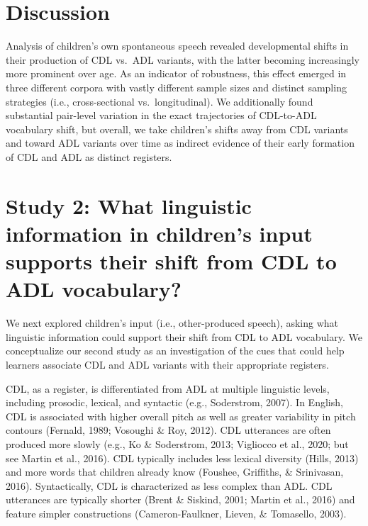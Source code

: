 \documentclass[10pt, letterpaper]{article}
\begin{document}
\hypertarget{discussion}{%
\section{Discussion}\label{discussion}}

Analysis of children's own spontaneous speech revealed developmental
shifts in their production of CDL vs.~ADL variants, with the latter
becoming increasingly more prominent over age. As an indicator of
robustness, this effect emerged in three different corpora with vastly
different sample sizes and distinct sampling strategies (i.e.,
cross-sectional vs.~longitudinal). We additionally found substantial
pair-level variation in the exact trajectories of CDL-to-ADL vocabulary
shift, but overall, we take children's shifts away from CDL variants and
toward ADL variants over time as indirect evidence of their early
formation of CDL and ADL as distinct registers.

\hypertarget{study-2-what-linguistic-information-in-childrens-input-supports-their-shift-from-cdl-to-adl-vocabulary}{%
\section{Study 2: What linguistic information in children's input
supports their shift from CDL to ADL
vocabulary?}\label{study-2-what-linguistic-information-in-childrens-input-supports-their-shift-from-cdl-to-adl-vocabulary}}

We next explored children's input (i.e., other-produced speech), asking
what linguistic information could support their shift from CDL to ADL
vocabulary. We conceptualize our second study as an investigation of the
cues that could help learners associate CDL and ADL variants with their
appropriate registers.

CDL, as a register, is differentiated from ADL at multiple linguistic
levels, including prosodic, lexical, and syntactic (e.g., Soderstrom,
2007). In English, CDL is associated with higher overall pitch as well
as greater variability in pitch contours (Fernald, 1989; Vosoughi \&
Roy, 2012). CDL utterances are often produced more slowly (e.g., Ko \&
Soderstrom, 2013; Vigliocco et al., 2020; but see Martin et al., 2016).
CDL typically includes less lexical diversity (Hills, 2013) and more
words that children already know (Foushee, Griffiths, \& Srinivasan,
2016). Syntactically, CDL is characterized as less complex than ADL. CDL
utterances are typically shorter (Brent \& Siskind, 2001; Martin et al.,
2016) and feature simpler constructions (Cameron-Faulkner, Lieven, \&
Tomasello, 2003).
\end{document}
